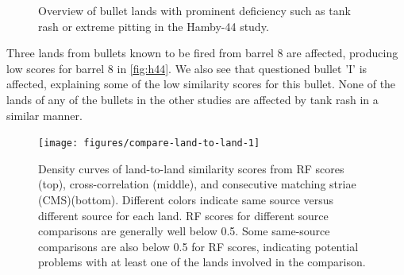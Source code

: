 \documentclass[doubleblind]{elsarticle}\usepackage[]{graphicx}\usepackage[]{color}
\newenvironment{knitrout}{}{} %
\begin{document}
\begin{knitrout}
\begin{figure}
\caption[Overview of bullet lands with prominent deficiency such as tank rash or extreme pitting in the Hamby-44 study]{Overview of bullet lands with prominent deficiency such as tank rash or extreme pitting in the Hamby-44 study.}\label{fig:tankrash}
\end{figure}


\end{knitrout}

Three lands from bullets known to be fired from barrel 8 are affected, producing low scores for barrel 8 in \autoref{fig:h44}. We also see that questioned bullet 'I' is affected, explaining some of the low similarity scores for this bullet.
None of the lands of any of the bullets in the other studies are affected by tank rash in a similar manner.










\begin{knitrout}
\color{fgcolor}\begin{figure}

{\centering \texttt{[image: figures/compare-land-to-land-1]} 

}

\caption[Density curves of land-to-land similarity scores from RF scores (top), cross-correlation (middle), and consecutive matching striae (CMS)(bottom)]{Density curves of land-to-land similarity scores from RF scores (top), cross-correlation (middle), and consecutive matching striae (CMS)(bottom). Different colors indicate same source versus different source for each land. RF scores for different source comparisons are generally well below 0.5. Some same-source comparisons are also below 0.5 for RF scores, indicating potential problems with at least one of the lands involved in the comparison.}\label{fig:compare-land-to-land}
\end{figure}


\end{knitrout}
\end{document}
